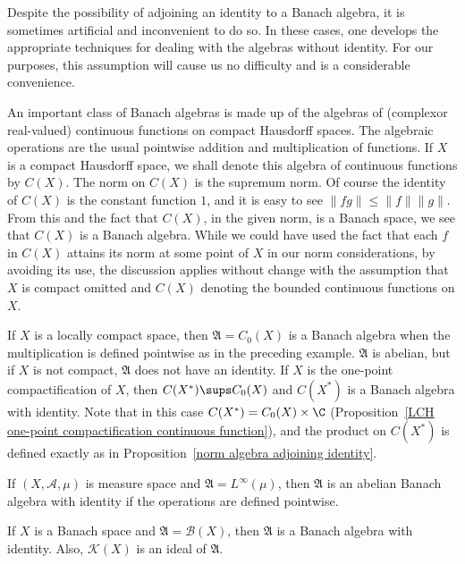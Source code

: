 Despite the possibility of adjoining an identity to a Banach algebra, it is sometimes artificial and inconvenient to do so. In these cases, one develops the appropriate techniques for dealing with the algebras without identity. For our purposes, this assumption will cause us no difficulty and is a considerable convenience.
\begin{example}
An important class of Banach algebras is made up of the algebras of (complexor real-valued) continuous functions on compact Hausdorff spaces. The algebraic operations are the usual pointwise addition and multiplication of functions. If $X$ is a compact Hausdorff space, we shall denote this algebra of continuous functions by $C(X)$. The norm on $C(X)$ is the supremum norm. Of course the identity of $C(X)$ is the constant function $1$, and it is easy to see $\|fg\|\leq\|f\|\|g\|$. From this and the fact that $C(X)$, in the given norm, is a Banach space, we see that $C(X)$ is a Banach algebra. While we could have used the fact that each $f$ in $C(X)$ attains its norm at some point of $X$ in our norm considerations, by avoiding its use, the discussion applies without change with the assumption that $X$ is compact omitted and $C(X)$ denoting the bounded continuous functions on $X$.
\end{example}
\begin{example}
If $X$ is a locally compact space, then $\mathfrak{A}=C_0(X)$ is a Banach algebra when the multiplication is defined pointwise as in the preceding example. $\mathfrak{A}$ is abelian, but if $X$ is not compact, $\mathfrak{A}$ does not have an identity. If $X$ is the one-point compactification of $X$, then $C(X^*)\sups C_0(X)$ and $C(X^*)$ is a Banach algebra with identity. Note that in this case $C(X^*)=C_0(X)\times\C$ (Proposition~\ref{LCH one-point compactification continuous function}), and the product on $C(X^*)$ is defined exactly as in Proposition~\ref{norm algebra adjoining identity}.
\end{example}
\begin{example}
If $(X,\mathcal{A},\mu)$ is measure space and $\mathfrak{A}=L^\infty(\mu)$, then $\mathfrak{A}$ is an abelian Banach algebra with identity if the operations are defined pointwise.
\end{example}
\begin{example}
If $X$ is a Banach space and $\mathfrak{A}=\mathcal{B}(X)$, then $\mathfrak{A}$ is a Banach algebra with identity. Also, $\mathcal{K}(X)$ is an ideal of $\mathfrak{A}$.
\end{example}
